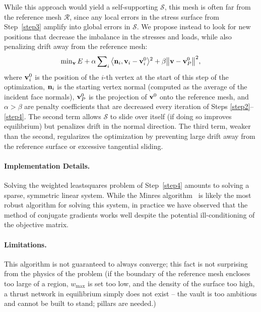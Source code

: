 \documentclass[review]{acmsiggraph}
\def\<{\mathchoice{\big\langle}{\langle}{\langle}{\langle}}
\def\>{\mathchoice{\big\rangle}{\rangle}{\rangle}{\rangle}}
\def\SS{{\mathcal S}}
\def\RR{{\mathcal R}}
\begin{document}
While this approach would yield a self-supporting $\SS$, this mesh is
often far from the reference mesh $\RR$, since any local errors in the
stress surface from Step~\ref{step3} amplify into global errors in $\SS$.
We propose instead to look for new positions that decrease the imbalance
in the stresses and loads, while also penalizing drift away from the
reference mesh:
	\begin{align*}
	\min\nolimits_{\vw} E
	+ \alpha \sum\nolimits_i
		\<\nw_i, \vw_i - \vw^0_i \>^2
		+ \beta \big\|\vw - \vw^0_P\big\|^2,
	\end{align*}
 where ${\mathbf v}^0_i$ is the position of the $i$-th vertex at the start of this
step of the optimization, ${\mathbf n}_i$ is the starting vertex normal (computed
as the average of the incident face normals), ${\mathbf v}^0_P$ is the projection
of ${\mathbf v}^0$ onto the reference mesh, and $\alpha > \beta$ are penalty
coefficients that are decreased every iteration of Steps
\ref{step2}--\ref{step4}. The second term allows $\SS$ to
slide over itself (if doing so improves equilibrium) but penalizes drift
in the normal direction. The third term, weaker than the second,
regularizes the optimization by preventing large drift away from the
reference surface or excessive tangential sliding.

\paragraph{Implementation Details.}

Solving the weighted least\dash squares problem of Step~\ref{step4}
amounts to solving a sparse, symmetric linear system. While the {\sc Minres}
algorithm~\cite{paige75} is likely the most robust algorithm for solving
this system, in practice we have observed that the method of conjugate
gradients works well despite the potential ill-conditioning of the
objective matrix.





\paragraph{Limitations.}

This algorithm is not guaranteed to always converge; this fact is not
surprising from the physics of the problem (if the boundary of the
reference mesh encloses too large of a region, $w_{\max}$ is set too low,
and the density of the surface too high, a thrust network in equilibrium
simply does not exist -- the vault is too ambitious and cannot be built to
stand; pillars are needed.)
\end{document}
